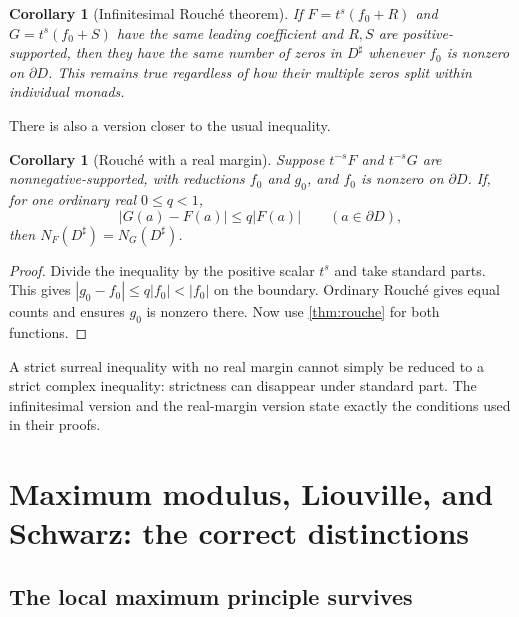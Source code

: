 \documentclass[11pt,letterpaper]{article}
\numberwithin{equation}{section}
\newtheorem{corollary}[theorem]{Corollary}
\theoremstyle{definition}
\theoremstyle{remark}
\begin{document}
\begin{corollary}[Infinitesimal Rouch\'e theorem]\label{cor:infrouche}
If $F=t^s(f_0+R)$ and $G=t^s(f_0+S)$ have the same leading coefficient and
$R,S$ are positive-supported, then they have the same number of zeros in
$D^\sharp$ whenever $f_0$ is nonzero on $\partial D$. This remains true
regardless of how their multiple zeros split within individual monads.
\end{corollary}

There is also a version closer to the usual inequality.

\begin{corollary}[Rouch\'e with a real margin]\label{cor:marginrouche}
Suppose $t^{-s}F$ and $t^{-s}G$ are nonnegative-supported, with reductions
$f_0$ and $g_0$, and $f_0$ is nonzero on $\partial D$. If, for one ordinary
real $0\le q<1$,
\begin{equation}\label{eq:rouchemargin}
 |G(a)-F(a)|\le q|F(a)|\qquad(a\in\partial D),
\end{equation}
then $N_F(D^\sharp)=N_G(D^\sharp)$.
\end{corollary}
\begin{proof}
Divide the inequality by the positive scalar $t^s$ and take standard parts.
This gives $|g_0-f_0|\le q|f_0|<|f_0|$ on the boundary. Ordinary
Rouch\'e gives equal counts and ensures $g_0$ is nonzero there. Now use
\cref{thm:rouche} for both functions.
\end{proof}

A strict surreal inequality with no real margin cannot simply be reduced to
a strict complex inequality: strictness can disappear under standard part.
The infinitesimal version and the real-margin version state exactly the
conditions used in their proofs.

\section{Maximum modulus, Liouville, and Schwarz: the correct distinctions}\label{sec:growth}

\subsection{The local maximum principle survives}
\end{document}
